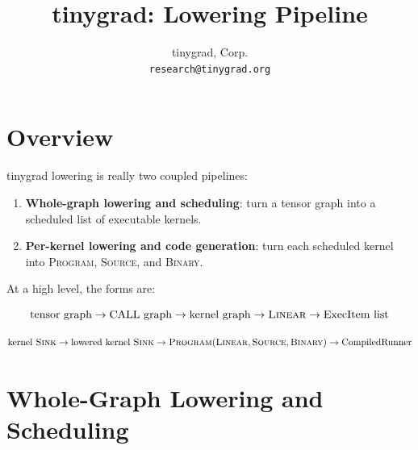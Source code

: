 \documentclass[10pt,letterpaper]{article}
\title{tinygrad: Lowering Pipeline}
\author{tinygrad, Corp. \\ \texttt{research@tinygrad.org}}
\date{}
\newcommand{\op}[1]{\textsc{#1}}
\begin{document}
\maketitle
\thispagestyle{empty}


\medskip

\section*{Overview}

tinygrad lowering is really two coupled pipelines:

\begin{enumerate}[leftmargin=*]
\item \textbf{Whole-graph lowering and scheduling}: turn a tensor graph into a scheduled list of executable kernels.
\item \textbf{Per-kernel lowering and code generation}: turn each scheduled kernel into \op{Program}, \op{Source}, and \op{Binary}.
\end{enumerate}

At a high level, the forms are:

\[
\text{tensor graph} \rightarrow \text{CALL graph} \rightarrow \text{kernel graph} \rightarrow \op{Linear} \rightarrow \text{ExecItem list}
\]

\[
\text{kernel } \op{Sink} \rightarrow \text{lowered kernel } \op{Sink} \rightarrow \op{Program}(\op{Linear}, \op{Source}, \op{Binary}) \rightarrow \text{CompiledRunner}
\]

\section*{Whole-Graph Lowering and Scheduling}
\end{document}
